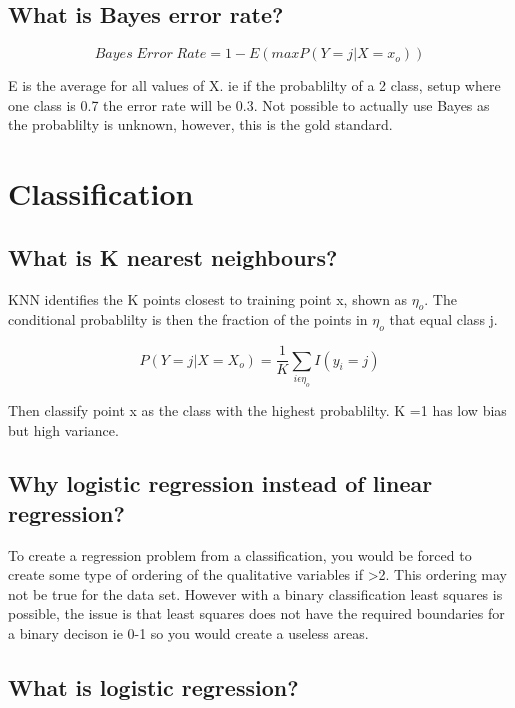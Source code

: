 \documentclass[11pt]{scrartcl} %
\begin{document}
\subsection{What is Bayes error rate?}

\begin{equation}
	Bayes\; Error\; Rate = 1 - E(maxP(Y=j|X=x_o))
\end{equation}

E is the average for all values of X. ie if the probablilty of a 2 class, setup where one class is 0.7 the error rate
will be 0.3. Not possible to actually use Bayes as the probablilty is unknown, however, this is the gold standard.

\section{Classification}

\subsection{What is K nearest neighbours?}

KNN identifies the K points closest to training point x, shown as \(\eta_o\). The conditional probablilty is then
the fraction of the points in \(\eta_o\) that equal class j.

\begin{equation}
	P(Y=j|X=X_o) = \frac{1}{K}\sum_{i\epsilon \eta_o}{I(y_i=j)}
\end{equation}

Then classify point x as the class with the highest probablilty. K =1 has low bias but high variance.

\subsection{Why logistic regression instead of linear regression?}

To create a regression problem from a classification, you would be forced to create some type of ordering of the qualitative
variables if >2. This ordering may not be true for the data set. However with a binary classification least squares is possible, the
issue is that least squares does not have the required boundaries for a binary decison ie 0-1 so you would create a useless areas.

\subsection{What is logistic regression?}
\end{document}
